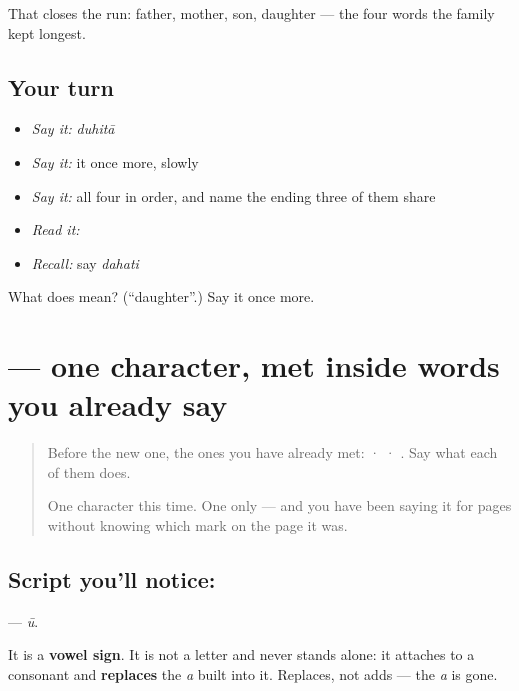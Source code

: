 \begin{grammarlens}[title={What you've built}]
That closes the run: father, mother, son, daughter — the four words the family kept longest.
\end{grammarlens}

\subsection*{Your turn}
\begin{itemize}
\raggedright
  \item \emph{Say it:} \emph{duhitā}
  \item \emph{Say it:} it once more, slowly
  \item \emph{Say it:} all four in order, and name the ending three of them share
  \item \emph{Read it:} \textbf{}
  \item \emph{Recall:} say \emph{dahati}
\end{itemize}

\begin{tcolorbox}[breakable,colback=teal!4,colframe=teal!35!black,title={Before you move on}]
What does  mean? (\textquotedblleft{}daughter\textquotedblright{}.) Say it once more.
\end{tcolorbox}
\section[\texorpdfstring{\sk{ू} (ū)}{ू (ū)}]{ — one character, met inside words you already say}

\label{lesson:SA-S222-vowel-sign-uu}



\begin{quote}
Before the new one, the ones you have already met:  ·  · . Say what each of them does.

One character this time. One only — and you have been saying it for pages without knowing which mark on the page it was.
\end{quote}

\subsection*{Script you'll notice: }
\textbf{} — \emph{ū}.

It is a \textbf{vowel sign}. It is not a letter and never stands alone: it attaches to a consonant and \textbf{replaces} the \emph{a} built into it. Replaces, not adds — the \emph{a} is gone.

